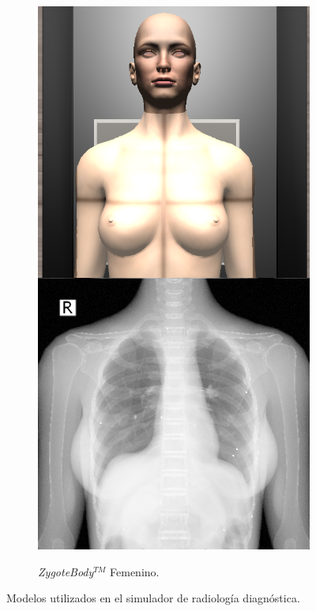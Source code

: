 \begin{figure}[h]
\begin{subfigure}[b]{0.24\linewidth}
    \end{subfigure}
     \begin{subfigure}[b]{0.24\linewidth}
        \centering
        {\includegraphics[width=\linewidth]{IMG/femaleex.png}}
        \caption{\emph{ZygoteBody}$^{TM}$ Femenino.}
    \end{subfigure}
    \caption{\label{fig:xraymodels} Modelos utilizados en el simulador de radiología diagnóstica.}
   \end{figure}
   
